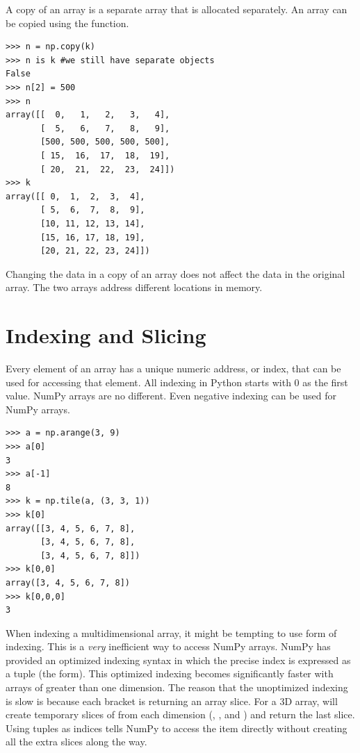 A copy of an array is a separate array that is allocated separately.
An array can be copied using the  function.
\begin{lstlisting}
>>> n = np.copy(k)
>>> n is k #we still have separate objects
False
>>> n[2] = 500
>>> n
array([[  0,   1,   2,   3,   4],
       [  5,   6,   7,   8,   9],
       [500, 500, 500, 500, 500],
       [ 15,  16,  17,  18,  19],
       [ 20,  21,  22,  23,  24]])
>>> k
array([[ 0,  1,  2,  3,  4],
       [ 5,  6,  7,  8,  9],
       [10, 11, 12, 13, 14],
       [15, 16, 17, 18, 19],
       [20, 21, 22, 23, 24]])
\end{lstlisting}
Changing the data in a copy of an array does not affect the data in the original array.
The two arrays address different locations in memory.

\section*{Indexing and Slicing}
Every element of an array has a unique numeric address, or index, that can be used for accessing that element.
All indexing in Python starts with 0 as the first value.  
NumPy arrays are no different.  Even negative indexing can be used for NumPy arrays.
\begin{lstlisting}
>>> a = np.arange(3, 9)
>>> a[0]
3
>>> a[-1]
8
>>> k = np.tile(a, (3, 3, 1))
>>> k[0]
array([[3, 4, 5, 6, 7, 8],
       [3, 4, 5, 6, 7, 8],
       [3, 4, 5, 6, 7, 8]])
>>> k[0,0]
array([3, 4, 5, 6, 7, 8])
>>> k[0,0,0]
3
\end{lstlisting}
When indexing a multidimensional array, it might be tempting to use  form of indexing.  
This is a \emph{very} inefficient way to access NumPy arrays.
NumPy has provided an optimized indexing syntax in which the precise index is expressed as a tuple (the  form).  This optimized indexing becomes significantly faster with arrays of greater than one dimension.
The reason that the unoptimized indexing is slow is because each bracket is returning an array slice.  
For a 3D array,  will create temporary slices of  from each dimension (, , and ) and return the last slice.
Using tuples as indices tells NumPy to access the item directly without creating all the extra slices along the way.

